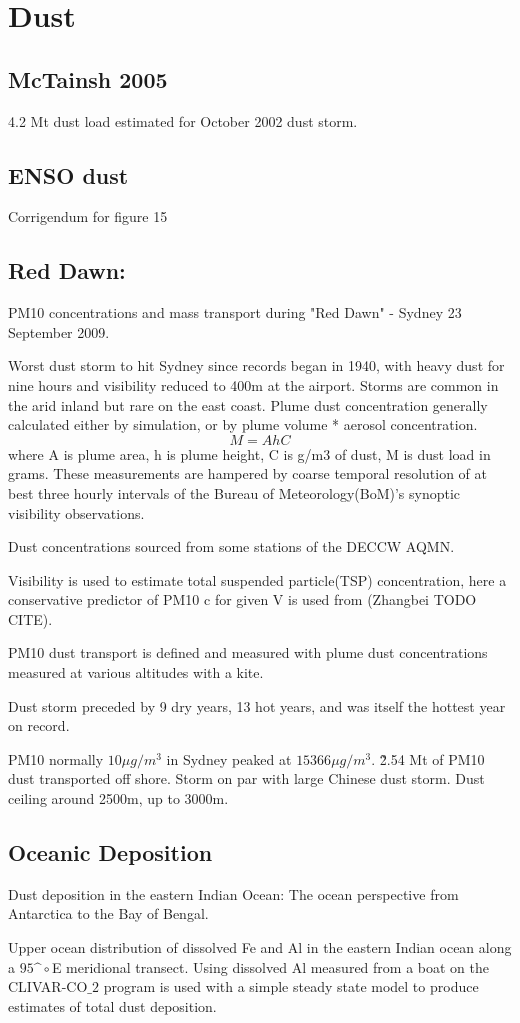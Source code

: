 \section{Dust}

\subsection{McTainsh 2005}
4.2 Mt dust load estimated for October 2002 dust storm.

\subsection{ENSO dust \cite{Rotstayn_2011}}
Corrigendum for figure 15

\subsection{Red Dawn: \cite{Leys_2011}}
PM10 concentrations and mass transport during "Red Dawn" - Sydney 23 September 2009.

Worst dust storm to hit Sydney since records began in 1940, with heavy dust for nine hours and visibility reduced to 400m at the airport.
Storms are common in the arid inland but rare on the east coast.
Plume dust concentration generally calculated either by simulation, or by plume volume * aerosol concentration.
$$M = AhC$$ 
where A is plume area, h is plume height, C is g/m3 of dust, M is dust load in grams.
These measurements are hampered by coarse temporal resolution of at best three hourly intervals of the Bureau of Meteorology(BoM)'s synoptic visibility observations.

Dust concentrations sourced from some stations of the DECCW AQMN.

Visibility is used to estimate total suspended particle(TSP) concentration, here a conservative predictor of PM10 c for given V is used from (Zhangbei TODO CITE).

PM10 dust transport is defined and measured with plume dust concentrations measured at various altitudes with a kite. 

Dust storm preceded by 9 dry years, 13 hot years, and was itself the hottest year on record.

PM10 normally $10{\mu}g/m^3$ in Sydney peaked at $15366{\mu}g/m^3$.
\~2.54 Mt of PM10 dust transported off shore.
Storm on par with large Chinese dust storm.
Dust ceiling around 2500m, up to 3000m.


\subsection{Oceanic Deposition \cite{Grand_2015}}
Dust deposition in the eastern Indian Ocean: The ocean perspective from Antarctica to the Bay of Bengal.

Upper ocean distribution of dissolved Fe and Al in the eastern Indian ocean along a $95\^{\circ}$E meridional transect.
Using dissolved Al measured from a boat on the CLIVAR-CO$\_{2}$ program is used with a simple steady state model to produce estimates of total dust deposition.
  
  